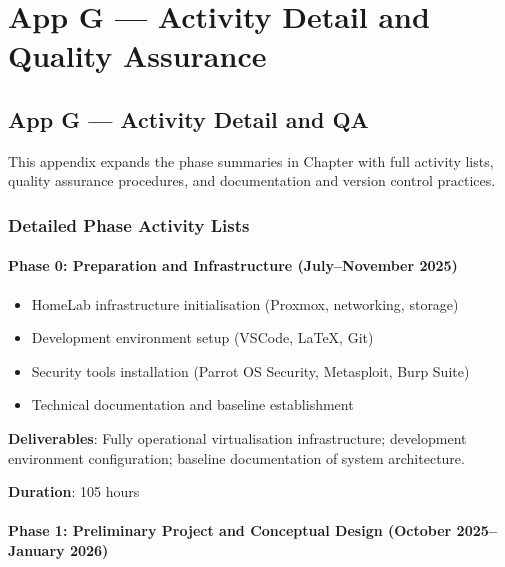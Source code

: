 \chapter{App G --- Activity Detail and Quality Assurance}

\section{App G --- Activity Detail and QA}

This appendix expands the phase summaries in Chapter with full activity lists, quality assurance procedures, and documentation and version control practices.

\subsection{Detailed Phase Activity Lists}

\subsubsection{Phase 0: Preparation and Infrastructure (July--November 2025)}

\begin{itemize}
\tightlist
\item
  HomeLab infrastructure initialisation (Proxmox, networking, storage)
\item
  Development environment setup (VSCode, LaTeX, Git)
\item
  Security tools installation (Parrot OS Security, Metasploit, Burp Suite)
\item
  Technical documentation and baseline establishment
\end{itemize}

\textbf{Deliverables}: Fully operational virtualisation infrastructure; development environment configuration; baseline documentation of system architecture.

\textbf{Duration}: 105 hours

\subsubsection{Phase 1: Preliminary Project and Conceptual Design (October 2025--January 2026)}

